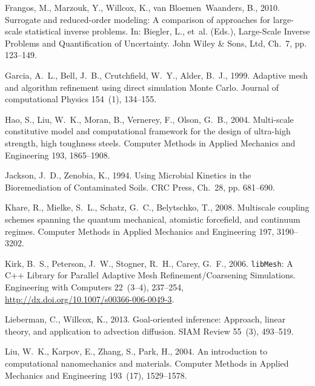 \documentclass[review,sort&compress]{elsarticle}
\theoremstyle{plain} %
\theoremstyle{definition} %
\begin{document}
\begin{thebibliography}{42}
Frangos, M., Marzouk, Y., Willcox, K., van Bloemen~Waanders, B., 2010.
  Surrogate and reduced-order modeling: A comparison of approaches for
  large-scale statistical inverse problems. In: Biegler, L., et~al. (Eds.),
  Large-Scale Inverse Problems and Quantification of Uncertainty. John Wiley \&
  Sons, Ltd, Ch.~7, pp. 123--149.

Garcia, A.~L., Bell, J.~B., Crutchfield, W.~Y., Alder, B.~J., 1999. Adaptive
  mesh and algorithm refinement using direct simulation {M}onte {C}arlo.
  Journal of computational Physics 154~(1), 134--155.

Hao, S., Liu, W.~K., Moran, B., Vernerey, F., Olson, G.~B., 2004. Multi-scale
  constitutive model and computational framework for the design of ultra-high
  strength, high toughness steels. Computer Methods in Applied Mechanics and
  Engineering 193, 1865--1908.

Jackson, J.~D., Zenobia, K., 1994. Using Microbial Kinetics in the
  Bioremediation of Contaminated Soils. CRC Press, Ch.~28, pp. 681--690.

Khare, R., Mielke, S.~L., Schatz, G.~C., Belytschko, T., 2008. Multiscale
  coupling schemes spanning the quantum mechanical, atomistic forcefield, and
  continuum regimes. Computer Methods in Applied Mechanics and Engineering 197,
  3190--3202.

Kirk, B.~S., Peterson, J.~W., Stogner, R.~H., Carey, G.~F., 2006.
  {\texttt{libMesh}: A {C}++ Library for Parallel Adaptive Mesh
  Refinement/Coarsening Simulations}. Engineering with Computers 22~(3--4),
  237--254, \url{http://dx.doi.org/10.1007/s00366-006-0049-3}.

Lieberman, C., Willcox, K., 2013. Goal-oriented inference: Approach, linear
  theory, and application to advection diffusion. SIAM Review 55~(3), 493--519.

Liu, W.~K., Karpov, E., Zhang, S., Park, H., 2004. An introduction to
  computational nanomechanics and materials. Computer Methods in Applied
  Mechanics and Engineering 193~(17), 1529--1578.


\end{thebibliography}
\end{document}
